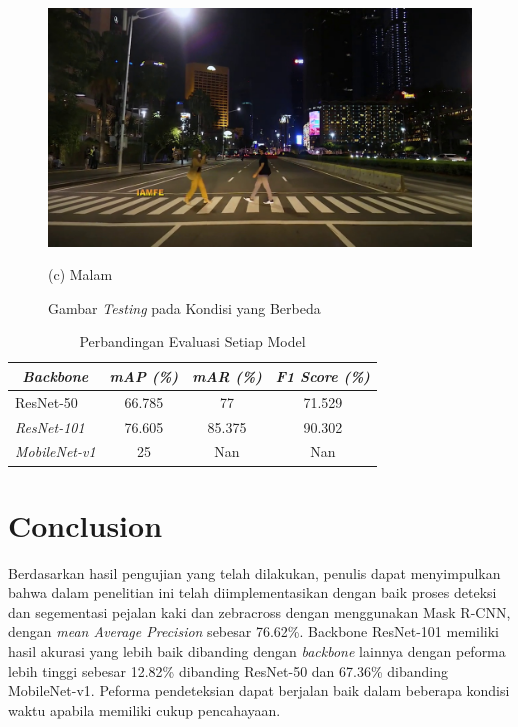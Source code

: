 \documentclass[conference]{IEEEtran}
\begin{document}
\begin{figure}[h]
\begin{minipage}[b]{0.2\textwidth}
			\includegraphics[width=\textwidth]{img/frame180.jpg}
			\caption*{(c) Malam}
		\end{minipage}
		\caption{{Gambar \textit{Testing} pada Kondisi yang Berbeda}}
		\label{fig:compare}
	\end{figure}

	\vspace{1ex}
	\begin{table}[h]
		\centering
		\begin{tabular}{|l|c|c|c|}
			\hline
			\multicolumn{1}{|c|}{\textit{\textbf{Backbone}}} & \textit{\textbf{mAP (\%)}} & \textit{\textbf{mAR (\%)}} & \textit{\textbf{F1 Score (\%)}} \\ \hline
			ResNet-50                                        & 66.785                     & 77                         & 71.529                          \\ \hline
			\textit{ResNet-101}                              & 76.605                     & 85.375                     & 90.302                          \\ \hline
			\textit{MobileNet-v1}                            & 25                         & Nan                        & Nan                             \\ \hline
		\end{tabular}
		\caption{Perbandingan Evaluasi Setiap Model}
		\label{tab:result}
	\end{table}
	
	\section{Conclusion}
	\vspace{1ex}
	Berdasarkan hasil pengujian yang telah dilakukan, penulis dapat menyimpulkan bahwa dalam penelitian ini telah diimplementasikan dengan baik proses deteksi dan segementasi pejalan kaki dan zebracross dengan menggunakan Mask R-CNN, dengan \textit{mean Average Precision} sebesar 76.62\%. {Backbone} ResNet-101 memiliki hasil akurasi yang lebih baik dibanding dengan \textit{backbone} lainnya dengan peforma lebih tinggi sebesar 12.82\% dibanding ResNet-50 dan 67.36\% dibanding MobileNet-v1. Peforma pendeteksian dapat berjalan baik dalam beberapa kondisi waktu apabila memiliki cukup pencahayaan. 
	
	
	
\end{document}
